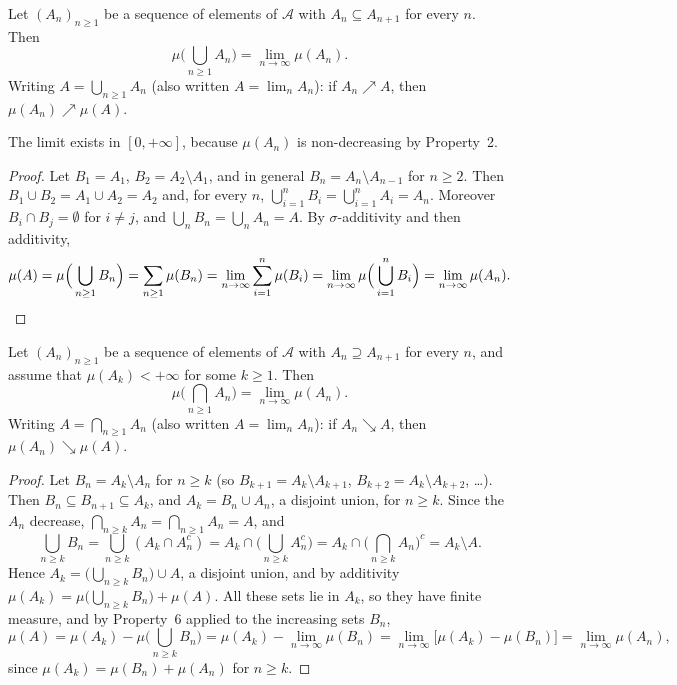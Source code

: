 \begin{theorem}\label{thm:ms-continuity-below}
Let $(A_n)_{n\ge1}$ be a sequence of elements of $\mathcal A$ with $A_n\subseteq A_{n+1}$ for
every $n$. Then
\[
  \mu\Big(\bigcup_{n\ge1}A_n\Big)=\lim_{n\to\infty}\mu(A_n).
\]
Writing $A=\bigcup_{n\ge1}A_n$ (also written $A=\lim_nA_n$): if $A_n\nearrow A$, then
$\mu(A_n)\nearrow\mu(A)$.
\end{theorem}

The limit exists in $[0,+\infty]$, because $\mu(A_n)$ is non-decreasing by Property~2.

\begin{proof}
Let $B_1=A_1$, $B_2=A_2\setminus A_1$, and in general $B_n=A_n\setminus A_{n-1}$ for $n\ge2$.
Then $B_1\cup B_2=A_1\cup A_2=A_2$ and, for every $n$, $\bigcup_{i=1}^nB_i=\bigcup_{i=1}^nA_i=A_n$.
Moreover $B_i\cap B_j=\emptyset$ for $i\ne j$, and $\bigcup_nB_n=\bigcup_nA_n=A$. By
$\sigma$-additivity and then additivity,
\[
  \mu(A)=\mu\Big(\bigcup_{n\ge1}B_n\Big)=\sum_{n\ge1}\mu(B_n)
  =\lim_{n\to\infty}\sum_{i=1}^n\mu(B_i)=\lim_{n\to\infty}\mu\Big(\bigcup_{i=1}^nB_i\Big)
  =\lim_{n\to\infty}\mu(A_n). \qedhere
\]
\end{proof}

\begin{theorem}\label{thm:ms-continuity-above}
Let $(A_n)_{n\ge1}$ be a sequence of elements of $\mathcal A$ with $A_n\supseteq A_{n+1}$ for
every $n$, and assume that $\mu(A_k)<+\infty$ for some $k\ge1$. Then
\[
  \mu\Big(\bigcap_{n\ge1}A_n\Big)=\lim_{n\to\infty}\mu(A_n).
\]
Writing $A=\bigcap_{n\ge1}A_n$ (also written $A=\lim_nA_n$): if $A_n\searrow A$, then
$\mu(A_n)\searrow\mu(A)$.
\end{theorem}

\begin{proof}
Let $B_n=A_k\setminus A_n$ for $n\ge k$ (so $B_{k+1}=A_k\setminus A_{k+1}$,
$B_{k+2}=A_k\setminus A_{k+2}$, \dots). Then $B_n\subseteq B_{n+1}\subseteq A_k$, and
$A_k=B_n\cup A_n$, a disjoint union, for $n\ge k$. Since the $A_n$ decrease,
$\bigcap_{n\ge k}A_n=\bigcap_{n\ge1}A_n=A$, and
\[
  \bigcup_{n\ge k}B_n=\bigcup_{n\ge k}(A_k\cap A_n^c)=A_k\cap\Big(\bigcup_{n\ge k}A_n^c\Big)
  =A_k\cap\Big(\bigcap_{n\ge k}A_n\Big)^c=A_k\setminus A .
\]
Hence $A_k=\big(\bigcup_{n\ge k}B_n\big)\cup A$, a disjoint union, and by additivity
$\mu(A_k)=\mu\big(\bigcup_{n\ge k}B_n\big)+\mu(A)$. All these sets lie in $A_k$, so they have
finite measure, and by Property~6 applied to the increasing sets $B_n$,
\[
  \mu(A)=\mu(A_k)-\mu\Big(\bigcup_{n\ge k}B_n\Big)=\mu(A_k)-\lim_{n\to\infty}\mu(B_n)
  =\lim_{n\to\infty}\big[\mu(A_k)-\mu(B_n)\big]=\lim_{n\to\infty}\mu(A_n),
\]
since $\mu(A_k)=\mu(B_n)+\mu(A_n)$ for $n\ge k$.
\end{proof}


